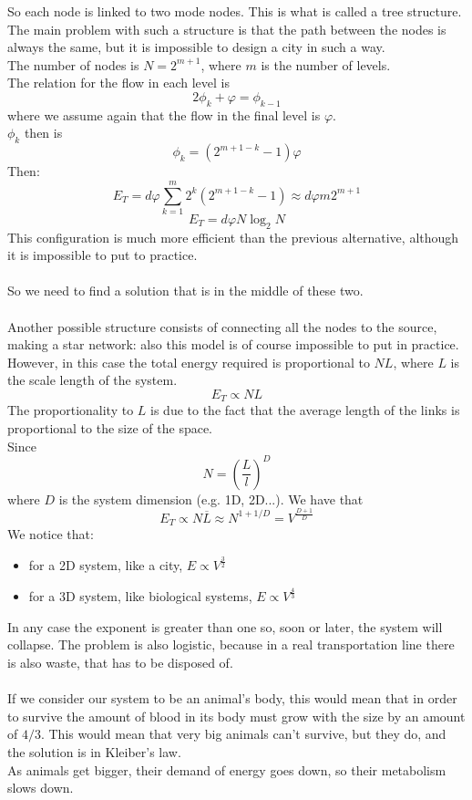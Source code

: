 So each node is linked to two mode nodes. This is what is called a tree structure. \\
The main problem with such a structure is that the path between the nodes is always the same, but it is impossible to design a city in such a way. \\
The number of nodes is $N = 2^{m+1}$, where $m$ is the number of levels. \\
The relation for the flow in each level is
$$
	2\phi_k + \varphi = \phi_{k-1}
$$
where we assume again that the flow in the final level is $\varphi$. \\
$\phi_k$ then is
$$
	\phi_k = (2^{m+1-k}-1)\varphi
$$
Then:
$$
	E_T = d\varphi\sum_{k=1}^m 2^k(2^{m+1-k}-1) \approx d\varphi m 2^{m+1}	
$$
$$
	E_T = d\varphi N \log_2N
$$
This configuration is much more efficient than the previous alternative, although it is impossible to put to practice. \\ \\ 
So we need to find a solution that is in the middle of these two. \\ \\
Another possible structure consists of connecting all the nodes to the source, making a star network: also this model is of course impossible to put in practice. \\
However, in this case the total energy required is proportional to $NL$, where $L$ is the scale length of the system. 
$$
	E_T \propto NL
$$
The proportionality to $L$ is due to the fact that the average length of the links is proportional to the size of the space. \\
Since 
$$
	N = \left(\frac{L}{l} \right)^D
$$
where $D$ is the system dimension (e.g. 1D, 2D...).
We have that
$$
	E_T \propto N\overline{L} \approx N^{1+1/D} = V^{\frac{D+1}{D}}
$$
We notice that:
\begin{itemize}
	\item for a 2D system, like a city, $E \propto V^{\frac{3}{2}}$
	\item for a 3D system, like biological systems, $E \propto V^{\frac{4}{3}}$
\end{itemize}
In any case the exponent is greater than one so, soon or later, the system will collapse.
The problem is also logistic, because in a real transportation line there is also waste, that has to be disposed of. \\ \\
If we consider our system to be an animal's body, this would mean that in order to survive the amount of blood in its body must grow with the size by an amount of $4/3$. This would mean that very big animals can't survive, but they do, and the solution is in Kleiber's law. \\
As animals get bigger, their demand of energy goes down, so their metabolism slows down.  


